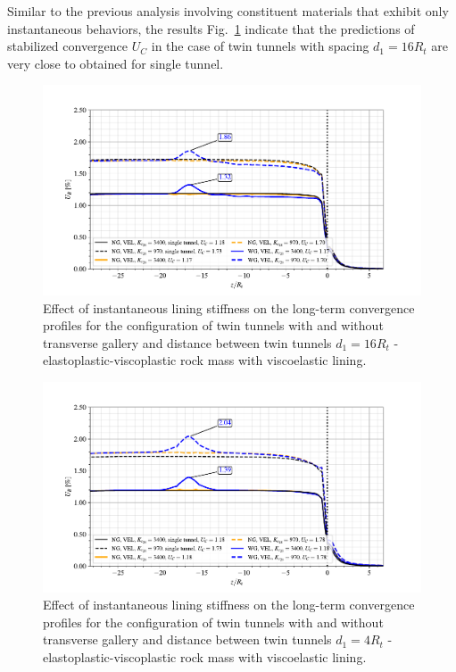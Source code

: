 \documentclass[Journal,letterpaper, NoLists,SectionNumbers]{ascelike-new}
\begin{document}
Similar to the previous analysis involving constituent materials that exhibit only instantaneous behaviors, the results Fig.~\ref{EPVP_VEL_d1_16Ri} indicate that the predictions of stabilized convergence $U_C$ in the case of twin tunnels with spacing $d_1=16R_t$ are very close to obtained for single tunnel.

\begin{figure}[h!]
	\centering
	\includegraphics[scale=0.9]{Convergence Profiles - EPVP_VEL_d1_16Ri_anotate.pdf}
	\caption{Effect of instantaneous lining stiffness on the long-term convergence profiles for the configuration of twin tunnels with and without transverse gallery and distance between twin tunnels $d_1=16R_t$ - elastoplastic-viscoplastic rock mass with viscoelastic lining.}
	\label{EPVP_VEL_d1_16Ri}
\end{figure}

\begin{figure}[h!]
	\centering
	\includegraphics[scale=0.9]{Convergence Profiles - EPVP_VEL_d1_4Ri_anotate.pdf}
	\caption{Effect of instantaneous lining stiffness on the long-term convergence profiles for the configuration of twin tunnels with and without transverse gallery and distance between twin tunnels $d_1=4R_t$ - elastoplastic-viscoplastic rock mass with viscoelastic lining.}
	\label{EPVP_VEL_d1_4Ri}
\end{figure}
\end{document}
